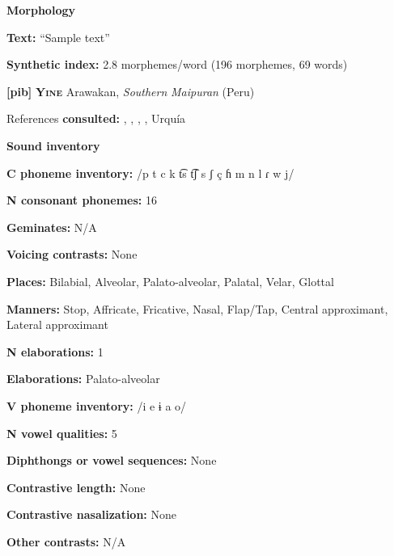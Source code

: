 \textbf{Morphology}



\textbf{Text:} “Sample text” \citep[79-80]{Holt1999}



\textbf{Synthetic index:} 2.8 morphemes/word (196 morphemes, 69 words)



\textbf{[pib]}   \textbf{\textsc{Yine}}  Arawakan, \textit{Southern} \textit{Maipuran} (Peru)



References \textbf{consulted:} \citet{Hanson2010}, \citet{Lin1997}, \citet{Matteson1965}, \citet{Parker1989}, Urquía \citet{SebastiánMarlett2008}



\textbf{Sound inventory}



\textbf{C phoneme inventory:} /p t c k t͡s t͡ʃ s ʃ ç ɦ m n l ɾ w j/



\textbf{N consonant phonemes:} 16



\textbf{Geminates:} N/A



\textbf{Voicing contrasts:} None



\textbf{Places:} Bilabial, Alveolar, Palato-alveolar, Palatal, Velar, Glottal



\textbf{Manners:} Stop, Affricate, Fricative, Nasal, Flap/Tap, Central approximant, Lateral approximant



\textbf{N elaborations:} 1



\textbf{Elaborations:} Palato-alveolar



\textbf{V phoneme inventory:} /i e ɨ a o/



\textbf{N vowel qualities:} 5



\textbf{Diphthongs or vowel sequences:} None



\textbf{Contrastive length:} None



\textbf{Contrastive nasalization:} None



\textbf{Other contrasts:} N/A



